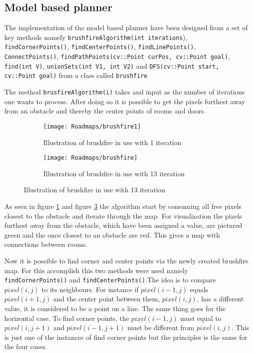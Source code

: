 \documentclass[../Head/Main.tex]{subfiles}
\begin{document}
\subsection{Model based planner}

The implementation of the model based planner have been designed from a set of key methods namely \texttt{brushfireAlgorithm(int iterations}), \texttt{findCornerPoints()}, \texttt{findCenterPoints()}, \texttt{findLinePoints()}, \texttt{ConnectPoints()}, \texttt{findPathPoints(cv::Point curPos, cv::Point goal)}, \texttt{find(int V)}, \texttt{unionSets(int V1, int V2)} and \texttt{DFS(cv::Point start, cv::Point goal)} from a class called \texttt{brushfire} 

The method \texttt{brusfireAlgorithm(i)} takes and input as the number of iterations one wants to process. After doing so it is possible to get the pixels furthest away from an obstacle and thereby the center points of rooms and doors.   

\begin{figure}[H]
  \begin{subfigure}[b]{0.49\textwidth}
    \centering
    \texttt{[image: Roadmaps/brushfire1]}
    \caption{Illustration of brushfire in use with 1 iteration}
    \label{fig:Brushfire1}
  \end{subfigure}
  \hfill
   \begin{subfigure}[b]{0.49\textwidth}
    \centering
    \texttt{[image: Roadmaps/brushfire]}
    \caption{Illustration of brushfire in use with 13 iteration}
    \label{fig:Brusfire2}
  \end{subfigure}
  \end{figure}
  
As seen in figure \ref{fig:Brushfire1} and figure \ref{fig:Brusfire2} the algorithm start by consuming all free pixels closest to the obstacle and iterate through the map. For visualization the pixels furthest away from the obstacle, which have been assigned a value, are pictured green and the once closest to an obstacle are red. This gives a map with connections between rooms. 
  
Now it is possible to find corner and center points via the newly created brushfire map. For this accomplish this two methods were used namely \texttt{findCornerPoints()} and \texttt{findCenterPoints()}.The idea is to compare $pixel(i,j)$ to its neighbours. For instance if $pixel(i-1,j)$ equals $pixel(i+1,j)$ and the center point between them, $pixel(i,j)$, has a different value, it is considered to be a point on a line. The same thing goes for the horizontal case. To find corner points, the $pixel(i-1,j)$ must equal to $pixel(i,j+1)$ and $pixel(i-1,j+1)$ must be different from $pixel(i,j)$. This is just one of the instances of find corner points but the principles is the same for the four cases.           
\end{document}
